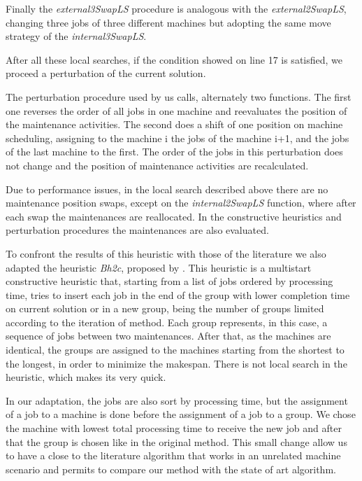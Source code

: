 \documentclass[a4paper,11pt]{article}
\begin{document}
Finally the \emph{external3SwapLS} procedure is analogous with the \emph{external2SwapLS}, changing three jobs of three different machines but adopting the same move strategy of the \emph{internal3SwapLS}. 

After all these local searches, if the condition showed on line 17 is satisfied, we proceed a perturbation of the current solution. 

The perturbation procedure used by us calls, alternately two functions. The first one reverses the order of all jobs in one machine and reevaluates the position of the maintenance activities. The second does a shift of one position on machine scheduling, assigning to the machine i the jobs of the machine i+1, and  the jobs of the last machine to the first. The order of the jobs in this perturbation does not change and the position of maintenance activities are recalculated.  

Due to performance issues, in the local search described above there are no maintenance position swaps, except on the \emph{internal2SwapLS} function, where after each swap the maintenances are reallocated. In the constructive heuristics and perturbation procedures the maintenances are also evaluated. 

To confront the results of this heuristic with those of the literature  we also adapted the heuristic \emph{Bh2c}, proposed by \cite{ruiz2017makespan}. This heuristic is a multistart constructive heuristic that, starting from a list of jobs ordered by processing time, tries to insert each job in the end of the group with lower completion time on current solution or in a new group, being the number of groups limited according to the iteration of method. Each group represents, in this case, a sequence of jobs between two maintenances. After that, as the machines are identical, the groups are assigned to the machines starting from the shortest to the longest, in order to minimize the makespan. There is not local search in the heuristic, which makes its very quick. 

In our adaptation, the jobs are also sort by processing time, but the assignment of a job to a machine is done before the assignment of a job to a group. We chose the machine with lowest total processing time to receive the new job and after that the group is chosen like in the original method. This small change allow us to have a close to the literature algorithm that works in an unrelated machine scenario and permits to compare our method with the state of art algorithm.
\end{document}
